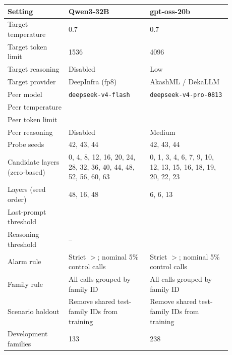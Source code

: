 \begin{tabular}{p{0.24\linewidth}p{0.32\linewidth}p{0.32\linewidth}}
\toprule
Setting & Qwen3-32B & gpt-oss-20b \\
\midrule
Target temperature & 0.7 & 0.7 \\
Target token limit & 1536 & 4096 \\
Target reasoning & Disabled & Low \\
Target provider & DeepInfra (fp8) & AkashML / DekaLLM \\
Peer model & \texttt{deepseek-v4-flash} & \texttt{deepseek-v4-pro-0813} \\
Peer temperature & \qwenPeerTemperature{} & \gptPeerTemperature{} \\
Peer token limit & \qwenPeerTokenLimit{} & \gptPeerTokenLimit{} \\
Peer reasoning & Disabled & Medium \\
Probe seeds & 42, 43, 44 & 42, 43, 44 \\
Candidate layers (zero-based) & 0, 4, 8, 12, 16, 20, 24, 28, 32, 36, 40, 44, 48, 52, 56, 60, 63 & 0, 1, 3, 4, 6, 7, 9, 10, 12, 13, 15, 16, 18, 19, 20, 22, 23 \\
Layers (seed order) & 48, 16, 48 & 6, 6, 13 \\
Last-prompt threshold & \qwenFrozenThreshold{} & \gptFrozenThreshold{} \\
Reasoning threshold & -- & \gptReasoningFrozenThreshold{} \\
Alarm rule & Strict $>$; nominal 5\% control calls & Strict $>$; nominal 5\% control calls \\
Family rule & All calls grouped by family ID & All calls grouped by family ID \\
Scenario holdout & Remove shared test-family IDs from training & Remove shared test-family IDs from training \\
Development families & 133 & 238 \\
\bottomrule
\end{tabular}
